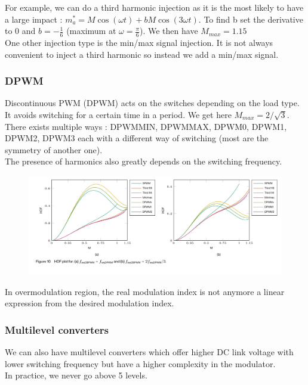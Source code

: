 \documentclass[../main.tex]{subfiles}
\begin{document}
For example, we can do a third harmonic injection as it is the most likely to have a large impact : $m_a^* = M\cos(\omega t) + bM \cos(3\omega t)$. To find b set the derivative to 0 and $b= -\frac{1}{6}$ (maximum at $\omega = \frac{\pi}{6}$). We then have $M_{max} = 1.15$\\

One other injection type is the min/max signal injection. It is not always convenient to inject a third harmonic so instead we add a min/max signal.


\subsubsection{DPWM}
Discontinuous PWM (DPWM) acts on the switches depending on the load type. It avoids switching for a certain time in a period. We get here $M_{max} = 2/\sqrt{3}$.\\

There exists multiple ways : DPWMMIN, DPWMMAX, DPWM0, DPWM1, DPWM2, DPWM3 each with a different way of switching (most are the symmetry of another one).\\

The presence of harmonics also greatly depends on the switching frequency.

\begin{figure}[hbt!]
    \centering
    \includegraphics[width=0.8\linewidth]{IMAGES/Indus_el/IMG_0188.jpeg}
\end{figure}

In overmodulation region, the real modulation index is not anymore a linear expression from the desired modulation index.\\

\subsubsection{Multilevel converters}
We can also have multilevel converters which offer higher DC link voltage with lower switching frequency but have a higher complexity in the modulator.\\
In practice, we never go above 5 levels.
\end{document}
